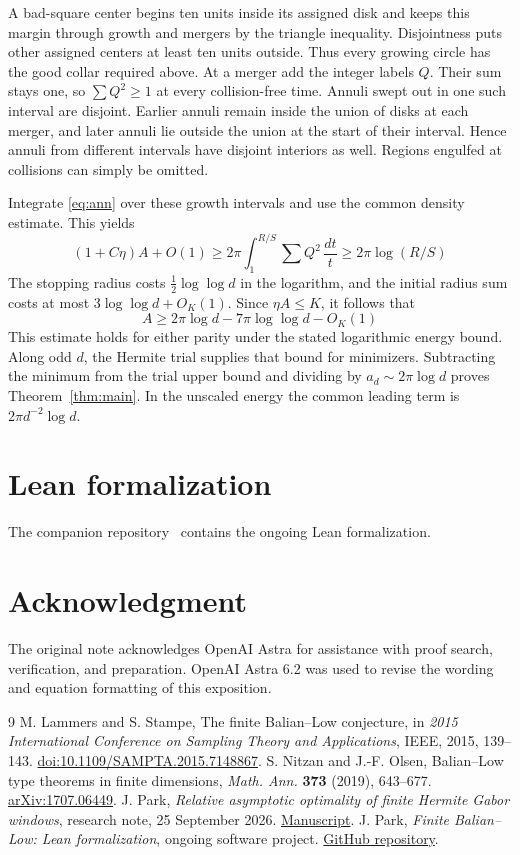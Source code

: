 \documentclass[11pt,reqno]{amsart}
\begin{document}
A bad-square center begins ten units inside its assigned disk and keeps this margin through growth and mergers by the triangle inequality. Disjointness puts other assigned centers at least ten units outside. Thus every growing circle has the good collar required above. At a merger add the integer labels $Q$. Their sum stays one, so $\sum Q^2\ge1$ at every collision-free time. Annuli swept out in one such interval are disjoint. Earlier annuli remain inside the union of disks at each merger, and later annuli lie outside the union at the start of their interval. Hence annuli from different intervals have disjoint interiors as well. Regions engulfed at collisions can simply be omitted.

Integrate \eqref{eq:ann} over these growth intervals and use the common density estimate. This yields
\[
 (1+C\eta)A+O(1)\ge 2\pi\int_1^{R/S}\sum Q^2\,\frac{dt}{t}
 \ge 2\pi\log(R/S)
\]
The stopping radius costs $\tfrac12\log\log d$ in the logarithm, and the initial radius sum costs at most $3\log\log d+O_K(1)$. Since $\eta A\le K$, it follows that
\[
 A\ge 2\pi\log d-7\pi\log\log d-O_K(1)
\]
This estimate holds for either parity under the stated logarithmic energy bound. Along odd $d$, the Hermite trial supplies that bound for minimizers. Subtracting the minimum from the trial upper bound and dividing by $a_d\sim2\pi\log d$ proves Theorem~\ref{thm:main}. In the unscaled energy the common leading term is $2\pi d^{-2}\log d$.

\section*{Lean formalization}
The companion repository~\cite{Lean} contains the ongoing Lean formalization.

\section*{Acknowledgment}
The original note acknowledges OpenAI Astra for assistance with proof search, verification, and preparation. OpenAI Astra 6.2 was used to revise the wording and equation formatting of this exposition.
\begin{thebibliography}{9}
 M. Lammers and S. Stampe, The finite Balian--Low conjecture, in \emph{2015 International Conference on Sampling Theory and Applications}, IEEE, 2015, 139--143. \href{https://doi.org/10.1109/SAMPTA.2015.7148867}{doi:10.1109/SAMPTA.2015.7148867}.
 S. Nitzan and J.-F. Olsen, Balian--Low type theorems in finite dimensions, \emph{Math. Ann.} \textbf{373} (2019), 643--677. \href{https://arxiv.org/abs/1707.06449}{arXiv:1707.06449}.
 J. Park, \emph{Relative asymptotic optimality of finite Hermite Gabor windows}, research note, 25 September 2026. \href{https://github.com/JosiahPark/balian-low-asymptotics-hermitian-optimality/blob/e0278c0160e4766abcd761c409512352ff1659de/relative_asymptotic_optimality.pdf}{Manuscript}.
 J. Park, \emph{Finite Balian--Low: Lean formalization}, ongoing software project. \href{https://github.com/JosiahPark/balian-low-asymptotics-hermitian-optimality}{GitHub repository}.
\end{thebibliography}
\end{document}
